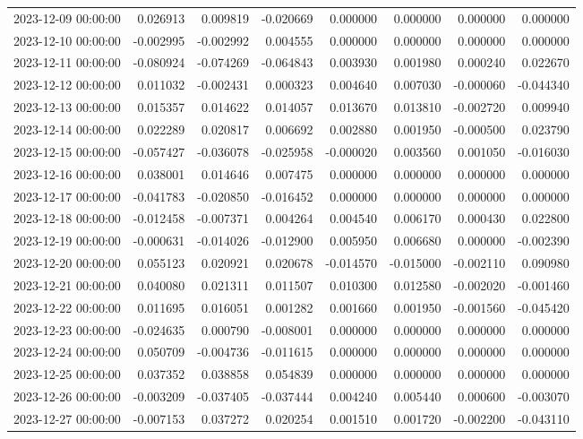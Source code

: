 \begin{tabular}{lrrrrrrr}
2023-12-09 00:00:00 & 0.026913 & 0.009819 & -0.020669 & 0.000000 & 0.000000 & 0.000000 & 0.000000 \\
2023-12-10 00:00:00 & -0.002995 & -0.002992 & 0.004555 & 0.000000 & 0.000000 & 0.000000 & 0.000000 \\
2023-12-11 00:00:00 & -0.080924 & -0.074269 & -0.064843 & 0.003930 & 0.001980 & 0.000240 & 0.022670 \\
2023-12-12 00:00:00 & 0.011032 & -0.002431 & 0.000323 & 0.004640 & 0.007030 & -0.000060 & -0.044340 \\
2023-12-13 00:00:00 & 0.015357 & 0.014622 & 0.014057 & 0.013670 & 0.013810 & -0.002720 & 0.009940 \\
2023-12-14 00:00:00 & 0.022289 & 0.020817 & 0.006692 & 0.002880 & 0.001950 & -0.000500 & 0.023790 \\
2023-12-15 00:00:00 & -0.057427 & -0.036078 & -0.025958 & -0.000020 & 0.003560 & 0.001050 & -0.016030 \\
2023-12-16 00:00:00 & 0.038001 & 0.014646 & 0.007475 & 0.000000 & 0.000000 & 0.000000 & 0.000000 \\
2023-12-17 00:00:00 & -0.041783 & -0.020850 & -0.016452 & 0.000000 & 0.000000 & 0.000000 & 0.000000 \\
2023-12-18 00:00:00 & -0.012458 & -0.007371 & 0.004264 & 0.004540 & 0.006170 & 0.000430 & 0.022800 \\
2023-12-19 00:00:00 & -0.000631 & -0.014026 & -0.012900 & 0.005950 & 0.006680 & 0.000000 & -0.002390 \\
2023-12-20 00:00:00 & 0.055123 & 0.020921 & 0.020678 & -0.014570 & -0.015000 & -0.002110 & 0.090980 \\
2023-12-21 00:00:00 & 0.040080 & 0.021311 & 0.011507 & 0.010300 & 0.012580 & -0.002020 & -0.001460 \\
2023-12-22 00:00:00 & 0.011695 & 0.016051 & 0.001282 & 0.001660 & 0.001950 & -0.001560 & -0.045420 \\
2023-12-23 00:00:00 & -0.024635 & 0.000790 & -0.008001 & 0.000000 & 0.000000 & 0.000000 & 0.000000 \\
2023-12-24 00:00:00 & 0.050709 & -0.004736 & -0.011615 & 0.000000 & 0.000000 & 0.000000 & 0.000000 \\
2023-12-25 00:00:00 & 0.037352 & 0.038858 & 0.054839 & 0.000000 & 0.000000 & 0.000000 & 0.000000 \\
2023-12-26 00:00:00 & -0.003209 & -0.037405 & -0.037444 & 0.004240 & 0.005440 & 0.000600 & -0.003070 \\
2023-12-27 00:00:00 & -0.007153 & 0.037272 & 0.020254 & 0.001510 & 0.001720 & -0.002200 & -0.043110 \\

\end{tabular}

